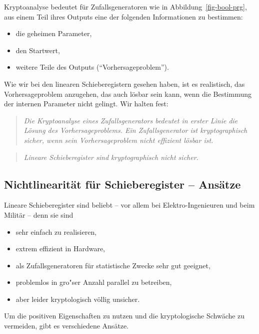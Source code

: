 \begin{refsegment}
Kryptoanalyse bedeutet für Zufallsgeneratoren wie in Abbildung~\ref{fig-bool-prg},
aus einem Teil ihres Outputs eine der folgenden Informationen zu bestimmen:
\begin{itemize}
\item die geheimen Parameter,
\item den Startwert,
\item weitere Teile des Outputs ("`Vorhersageproblem"').
\end{itemize}
Wie wir bei den linearen
Schieberegistern
gesehen haben, ist es
realistisch, das Vorhersageproblem anzugehen, das auch lösbar sein
kann, wenn die Bestimmung der internen Parameter nicht gelingt.
Wir halten fest:
\begin{quote}
   {\em Die Kryptoanalyse eines Zufallsgenerators bedeutet in erster Linie
   die Lösung des Vorhersageproblems. Ein Zufallsgenerator
   ist kryptographisch
   sicher, wenn sein Vorhersageproblem nicht effizient lösbar ist.}
\end{quote}

\begin{quote}
   {\em Lineare Schieberegister
   sind kryptographisch nicht sicher.}
\end{quote}

\subsection{Nichtlinearität für Schieberegister
   -- Ansätze}\label{ss-bool-nlsr}

Lineare Schieberegister sind beliebt -- vor allem bei Elektro-Ingenieuren
und beim Militär -- denn sie sind
\begin{itemize}
	\item sehr einfach zu realisieren,
	\item extrem effizient in Hardware,
	\item als Zufallsgeneratoren für statistische Zwecke sehr gut geeignet,
	\item problemlos in gro"ser Anzahl parallel zu betreiben,
	\item aber leider kryptologisch völlig unsicher.
\end{itemize}
Um die positiven Eigenschaften zu nutzen und die kryptologische Schwäche
zu vermeiden, gibt es verschiedene Ansätze.


\end{refsegment}
